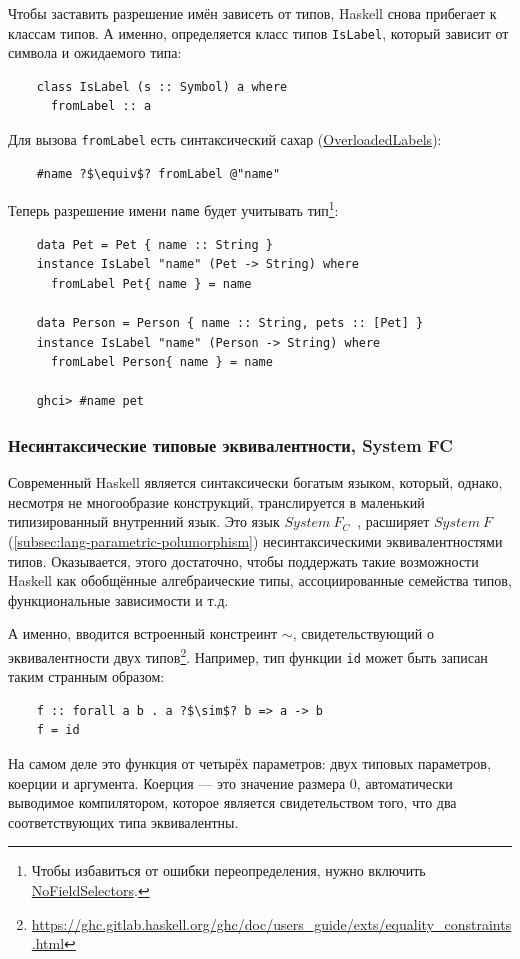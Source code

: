 Чтобы заставить разрешение имён зависеть от типов, Haskell снова прибегает к классам типов.
А именно, определяется класс типов \texttt{IsLabel}, который зависит от символа и ожидаемого типа:
\begin{verbatim}
    class IsLabel (s :: Symbol) a where
      fromLabel :: a
\end{verbatim}
Для вызова \texttt{fromLabel} есть синтаксический сахар (\href{https://ghc.gitlab.haskell.org/ghc/doc/users_guide/exts/overloaded_labels.html}{OverloadedLabels}):
\begin{verbatim}
    #name ?$\equiv$? fromLabel @"name"
\end{verbatim}
Теперь разрешение имени \texttt{name} будет учитывать тип\footnote{Чтобы избавиться от ошибки переопределения, нужно включить \href{https://ghc.gitlab.haskell.org/ghc/doc/users_guide/exts/field_selectors.html\#extension-FieldSelectors}{NoFieldSelectors}.}:
\begin{verbatim}
    data Pet = Pet { name :: String }
    instance IsLabel "name" (Pet -> String) where
      fromLabel Pet{ name } = name

    data Person = Person { name :: String, pets :: [Pet] }
    instance IsLabel "name" (Person -> String) where
      fromLabel Person{ name } = name

    ghci> #name pet
\end{verbatim}

\subsubsection{Несинтаксические типовые эквивалентности, System FC} \label{subsubsec:system-fc}

Современный Haskell является синтаксически богатым языком, который, однако, несмотря не многообразие конструкций, транслируется в маленький типизированный внутренний язык.
Это язык $System~F_C$~\cite{sulzmann2007system}, расширяет $System~F$ (\ref{subsec:lang-parametric-polumorphism}) несинтаксическими эквивалентностями типов.
Оказывается, этого достаточно, чтобы поддержать такие возможности Haskell как обобщённые алгебраические типы, ассоциированные семейства типов, функциональные зависимости и т.д.

А именно, вводится встроенный констреинт $\sim$, свидетельствующий о эквивалентности двух типов\footnote{\url{https://ghc.gitlab.haskell.org/ghc/doc/users_guide/exts/equality_constraints.html}}.
Например, тип функции \texttt{id} может быть записан таким странным образом:
\begin{verbatim}
    f :: forall a b . a ?$\sim$? b => a -> b
    f = id
\end{verbatim}
На самом деле это функция от четырёх параметров: двух типовых параметров, коерции и аргумента.
Коерция --- это значение размера 0, автоматически выводимое компилятором, которое является свидетельством того, что два соответствующих типа эквивалентны.

